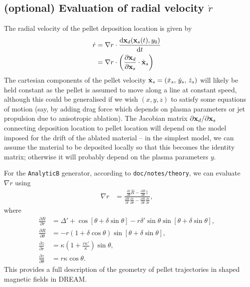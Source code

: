 \documentclass[11pt,a4paper]{article}
\newcommand{\rd}{\ensuremath{\mathrm{d}}}
\renewcommand{\b}[1]{\ensuremath{ {\bf #1 } }}
\begin{document}
\subsection*{(optional) Evaluation of radial velocity $\dot{r}$}
The radial velocity of the pellet deposition location is given by
\begin{align}
\dot{r} &= \nabla r \cdot \frac{\rd \b{x}_d(\b{x}_s(t), y_0)}{\rd t} \nonumber \\
&= \nabla r \cdot \left( \frac{\partial \b{x}_d}{\partial \b{x}_s} \cdot \dot{\b{x}}_s\right) 
\end{align}
The cartesian components of the pellet velocity $\dot{\b{x}}_s = (\dot{x}_s,\,\dot{y}_s,\,\dot{z}_s)$ will likely be held constant as the pellet is assumed to move along a line at constant speed, although this could be generalised if we wish $(x,y,z)$ to satisfy some equations of motion (say, by adding drag force which depends on plasma parameters or jet propulsion due to anisotropic ablation). The Jacobian matrix $\partial \b{x}_d/\partial \b{x}_s$ connecting deposition location to pellet location will depend on the model imposed for the drift of the ablated material -- in the simplest model, we can assume the material to be deposited locally so that this becomes the identity matrix; otherwise it will probably depend on the plasma parameters $y$.

For the \texttt{AnalyticB} generator, according to \texttt{doc/notes/theory}, we can evaluate $\nabla r$ using
\begin{align}
\nabla r &= \frac{\frac{\partial z}{\partial \theta} \hat{R} - \frac{\partial R}{\partial \theta} \hat{z}}{\frac{\partial R}{\partial r}\frac{\partial z}{\partial \theta} - \frac{\partial R}{\partial \theta}\frac{\partial z}{\partial r}},
\end{align}
where
\begin{align}
\frac{\partial R}{\partial r} &= \Delta' + \cos[\theta+\delta\sin\theta]-r\delta'\sin\theta\sin[\theta+\delta\sin\theta], \nonumber \\
\frac{\partial R}{\partial \theta} &= -r(1+\delta\cos\theta)\sin[\theta+\delta\sin\theta],  \nonumber \\
\frac{\partial z}{\partial r} &=  \kappa\left(1+ \frac{r\kappa'}{\kappa}\right)\sin\theta, \nonumber \\
\frac{\partial z}{\partial \theta} &= r\kappa\cos\theta.
\end{align}
This provides a full description of the geometry of pellet trajectories in shaped magnetic fields in DREAM. 
\end{document}
